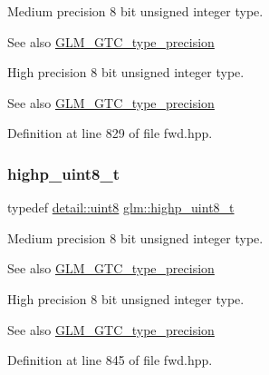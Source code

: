 Medium precision 8 bit unsigned integer type. \begin{DoxySeeAlso}{See also}
\hyperlink{group__gtc__type__precision}{G\+L\+M\+\_\+\+G\+T\+C\+\_\+type\+\_\+precision}
\end{DoxySeeAlso}
High precision 8 bit unsigned integer type. \begin{DoxySeeAlso}{See also}
\hyperlink{group__gtc__type__precision}{G\+L\+M\+\_\+\+G\+T\+C\+\_\+type\+\_\+precision} 
\end{DoxySeeAlso}


Definition at line 829 of file fwd.\+hpp.

\mbox{\label{group__gtc__type__precision_ga9ba529fcc75b82d23da979f0ce6e4518}} 
\subsubsection{\texorpdfstring{highp\+\_\+uint8\+\_\+t}{highp\_uint8\_t}}
{\footnotesize\ttfamily typedef \hyperlink{namespaceglm_1_1detail_aef2588f97d090cc19fbbe0c74fe17c8f}{detail\+::uint8} \hyperlink{group__gtc__type__precision_ga9ba529fcc75b82d23da979f0ce6e4518}{glm\+::highp\+\_\+uint8\+\_\+t}}

Medium precision 8 bit unsigned integer type. \begin{DoxySeeAlso}{See also}
\hyperlink{group__gtc__type__precision}{G\+L\+M\+\_\+\+G\+T\+C\+\_\+type\+\_\+precision}
\end{DoxySeeAlso}
High precision 8 bit unsigned integer type. \begin{DoxySeeAlso}{See also}
\hyperlink{group__gtc__type__precision}{G\+L\+M\+\_\+\+G\+T\+C\+\_\+type\+\_\+precision} 
\end{DoxySeeAlso}


Definition at line 845 of file fwd.\+hpp.

\mbox{\label{group__gtc__type__precision_gab3f08c031846e7a95b49e81c48d920d3}} 

